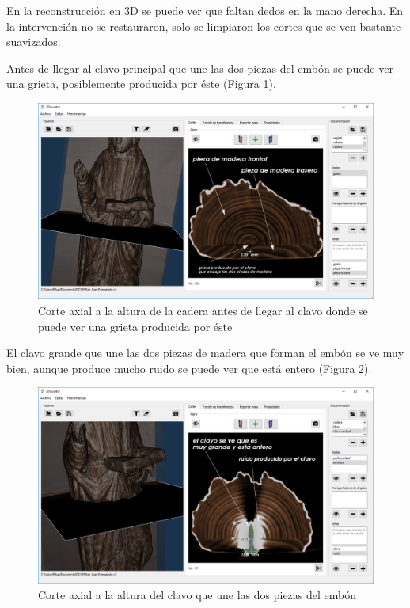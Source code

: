 En la reconstrucción en 3D se puede ver que faltan dedos en la mano derecha. En la intervención no se restauraron, solo se limpiaron los cortes que se ven bastante suavizados.

Antes de llegar al clavo principal que une las dos piezas del embón se puede ver una grieta, posiblemente producida por éste (Figura \ref{fig:resultados/documentacion/san-juan-evangelista/cadera}). 

\begin{figure}[H]
	\centering
	\includegraphics[width=12.5cm]{imagenes/resultados/documentacion/san-juan-evangelista/cadera}
	\caption{Corte axial a la altura de la cadera antes de llegar al clavo donde se puede ver una grieta producida por éste}
	\label{fig:resultados/documentacion/san-juan-evangelista/cadera}
\end{figure}

El clavo grande que une las dos piezas de madera que forman el embón se ve muy bien, aunque produce mucho ruido se puede ver que está entero (Figura \ref{fig:resultados/documentacion/san-juan-evangelista/clavo-central}). 

\begin{figure}[H]
	\centering
	\includegraphics[width=12.5cm]{imagenes/resultados/documentacion/san-juan-evangelista/clavo-central}
	\caption{Corte axial a la altura del clavo que une las dos piezas del embón}
	\label{fig:resultados/documentacion/san-juan-evangelista/clavo-central}
\end{figure}

